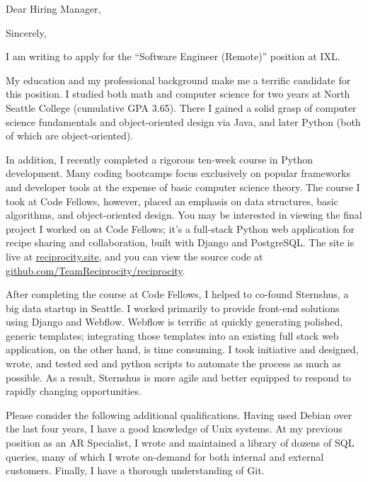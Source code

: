 \documentclass[10pt,a4paper,sans]{moderncv}        %
\begin{document}
\date{\today{}}
\opening{Dear Hiring Manager,}
\closing{Sincerely,}
\makelettertitle

I am writing to apply for the ``Software Engineer (Remote)'' position at IXL.

My education and my professional background make me a terrific candidate for
this position. I studied both math and computer science for two years at North
Seattle College (cumulative GPA 3.65). There I gained a solid grasp of computer
science fundamentals and object-oriented design via Java, and later Python (both
of which are object-oriented).

In addition, I recently completed a rigorous ten-week course in Python
development. Many coding bootcamps focus exclusively on popular frameworks and
developer tools at the expense of basic computer science theory. The course I
took at Code Fellows, however, placed an emphasis on data structures, basic
algorithms, and object-oriented design. You may be interested in viewing the
final project I worked on at Code Fellows; it's a full-stack Python web
application for recipe sharing and collaboration, built with Django and
PostgreSQL. The site is live at
{\href{http://reciprocity.site}{reciprocity.site}}, and you can view the source
code at
{\href{http://github.com/TeamReciprocity/reciprocity}{github.com/TeamReciprocity/reciprocity}}.

After completing the course at Code Fellows, I helped to co-found Sternshus, a
big data startup in Seattle. I worked primarily to provide front-end solutions
using Django and Webflow. Webflow is terrific at quickly generating polished,
generic templates; integrating those templates into an existing full stack web
application, on the other hand, is time consuming. I took initiative and
designed, wrote, and tested sed and python scripts to automate the process as
much as possible. As a result, Sternshus is more agile and better equipped to
respond to rapidly changing opportunities.

Please consider the following additional qualifications. Having used Debian over
the last four years, I have a good knowledge of Unix systems. At my previous
position as an AR Specialist, I wrote and maintained a library of dozens of SQL
queries, many of which I wrote on-demand for both internal and external
customers. Finally, I have a thorough understanding of Git.
\end{document}
